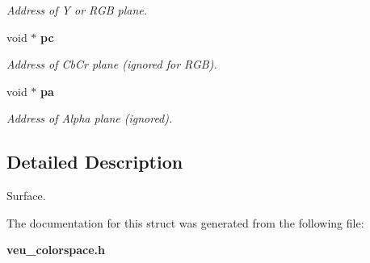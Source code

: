 \begin{DoxyCompactItemize}
\begin{DoxyCompactList}\small\item\em Address of Y or RGB plane. \item\end{DoxyCompactList}\item 
void $\ast$ {\bf pc}\label{structren__vid__surface_ae7db436aad329ac2cda96546a398d93b}

\begin{DoxyCompactList}\small\item\em Address of CbCr plane (ignored for RGB). \item\end{DoxyCompactList}\item 
void $\ast$ {\bf pa}\label{structren__vid__surface_a219cb9c0be749216075adc6a45e45bb2}

\begin{DoxyCompactList}\small\item\em Address of Alpha plane (ignored). \item\end{DoxyCompactList}\end{DoxyCompactItemize}


\subsection{Detailed Description}
Surface. 

The documentation for this struct was generated from the following file:\begin{DoxyCompactItemize}
\item 
{\bf veu\_\-colorspace.h}\end{DoxyCompactItemize}
